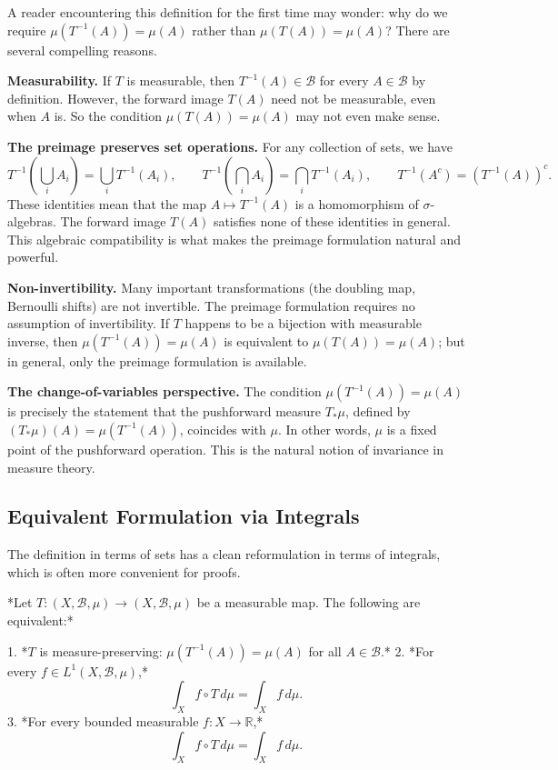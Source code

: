 A reader encountering this definition for the first time may wonder: why do we require $\mu(T^{-1}(A)) = \mu(A)$ rather than $\mu(T(A)) = \mu(A)$? There are several compelling reasons.

\textbf{Measurability.} If $T$ is measurable, then $T^{-1}(A) \in \mathcal{B}$ for every $A \in \mathcal{B}$ by definition. However, the forward image $T(A)$ need not be measurable, even when $A$ is. So the condition $\mu(T(A)) = \mu(A)$ may not even make sense.

\textbf{The preimage preserves set operations.} For any collection of sets, we have
\[
T^{-1}\!\left(\bigcup_i A_i\right) = \bigcup_i T^{-1}(A_i), \qquad T^{-1}\!\left(\bigcap_i A_i\right) = \bigcap_i T^{-1}(A_i), \qquad T^{-1}(A^c) = (T^{-1}(A))^c.
\]
These identities mean that the map $A \mapsto T^{-1}(A)$ is a homomorphism of $\sigma$-algebras. The forward image $T(A)$ satisfies none of these identities in general. This algebraic compatibility is what makes the preimage formulation natural and powerful.

\textbf{Non-invertibility.} Many important transformations (the doubling map, Bernoulli shifts) are not invertible. The preimage formulation requires no assumption of invertibility. If $T$ happens to be a bijection with measurable inverse, then $\mu(T^{-1}(A)) = \mu(A)$ is equivalent to $\mu(T(A)) = \mu(A)$; but in general, only the preimage formulation is available.

\textbf{The change-of-variables perspective.} The condition $\mu(T^{-1}(A)) = \mu(A)$ is precisely the statement that the pushforward measure $T_*\mu$, defined by $(T_*\mu)(A) = \mu(T^{-1}(A))$, coincides with $\mu$. In other words, $\mu$ is a fixed point of the pushforward operation. This is the natural notion of invariance in measure theory.

\subsection{Equivalent Formulation via Integrals}\label{sec:8.1.3}

The definition in terms of sets has a clean reformulation in terms of integrals, which is often more convenient for proofs.

\begin{proposition}\label{prop:8.2.}
*Let $T: (X, \mathcal{B}, \mu) \to (X, \mathcal{B}, \mu)$ be a measurable map. The following are equivalent:*

1. *$T$ is measure-preserving: $\mu(T^{-1}(A)) = \mu(A)$ for all $A \in \mathcal{B}$.*
2. *For every $f \in L^1(X, \mathcal{B}, \mu)$,*
\[
\int_X f \circ T \, d\mu = \int_X f \, d\mu.
\]
3. *For every bounded measurable $f: X \to \mathbb{R}$,*
\[
\int_X f \circ T \, d\mu = \int_X f \, d\mu.
\]
\end{proposition}


